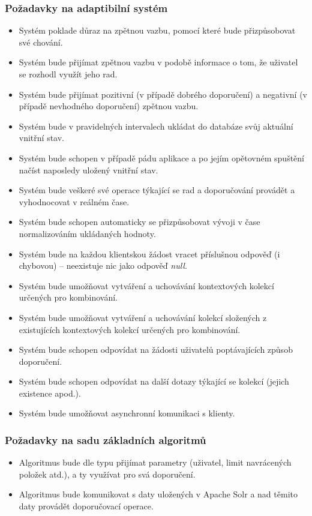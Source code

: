 \documentclass[thesis=M,czech]{FITthesis}[2014/05/07]
\begin{document}
\subsubsection{Požadavky na adaptibilní systém}

\begin{itemize}
	\item Systém poklade důraz na zpětnou vazbu, pomocí které bude přizpůsobovat své chování.
	\item Systém bude přijímat zpětnou vazbu v podobě informace o tom, že uživatel se rozhodl využít jeho rad.
	\item Systém bude přijímat pozitivní (v případě dobrého doporučení) a negativní (v případě nevhodného doporučení) zpětnou vazbu.
	\item Systém bude v pravidelných intervalech ukládat do databáze svůj aktuální vnitřní stav.
	\item Systém bude schopen v případě pádu aplikace a po jejím opětovném spuštění načíst naposledy uložený vnitřní stav.
	\item Systém bude veškeré své operace týkající se rad a doporučování provádět a vyhodnocovat v reálném čase.
	\item Systém bude schopen automaticky se přizpůsobovat vývoji v čase normalizováním ukládaných hodnoty.
	\item Systém bude na každou klientskou žádost vracet příslušnou odpověď (i chybovou) – neexistuje nic jako odpověď \emph{null}.	
	\item Systém bude umožňovat vytváření a uchovávání kontextových kolekcí určených pro kombinování.
	\item Systém bude umožňovat vytváření a uchovávání kolekcí složených z existujících kontextových kolekcí určených pro kombinování.	
	\item Systém bude schopen odpovídat na žádosti uživatelů poptávajících způsob doporučení.
	\item Systém bude schopen odpovídat na další dotazy týkající se kolekcí (jejich existence apod.).	
	\item Systém bude umožňovat asynchronní komunikaci s klienty.
\end{itemize}

\subsubsection{Požadavky na sadu základních algoritmů}
\begin{itemize}
	\item Algoritmus bude dle typu přijímat parametry (uživatel, limit navrácených položek atd.), a ty využívat pro svá doporučení.
	\item Algoritmus bude komunikovat s daty uložených v Apache Solr a nad těmito daty provádět doporučovací operace.
\end{itemize}
\end{document}
